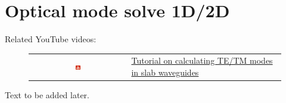 \section{Optical mode solve 1D/2D}


Related YouTube videos:
\begin{figure}[H]

\begin{tabular}{ c l }

\includegraphics[width=0.05\textwidth]{./images/youtube.png}

&
\href{https://www.youtube.com/watch?v=MECeuaRGJu8}{Tutorial on calculating TE/TM modes in slab waveguides}\
\\
\end{tabular}
\end{figure}

Text to be added later.

\newpage
